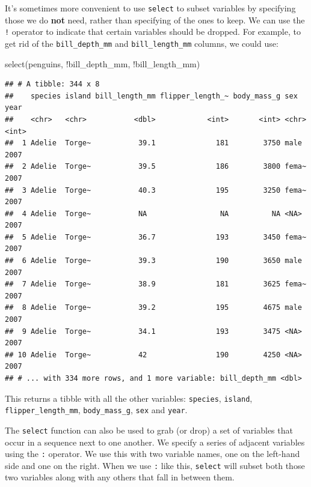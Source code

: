 \documentclass[
]{book}
\newenvironment{Shaded}{\begin{snugshade}}{\end{snugshade}}
\newcommand{\FunctionTok}[1]{\textcolor[rgb]{0.00,0.00,0.00}{#1}}
\newcommand{\NormalTok}[1]{#1}
\newcommand{\SpecialCharTok}[1]{\textcolor[rgb]{0.00,0.00,0.00}{#1}}
\begin{document}
It's sometimes more convenient to use \texttt{select} to subset variables by specifying those we do \textbf{not} need, rather than specifying of the ones to keep. We can use the \texttt{!} operator to indicate that certain variables should be dropped. For example, to get rid of the \texttt{bill\_depth\_mm} and \texttt{bill\_length\_mm} columns, we could use:

\begin{Shaded}
\begin{Highlighting}[]
\FunctionTok{select}\NormalTok{(penguins, }\SpecialCharTok{!}\NormalTok{bill\_depth\_mm, }\SpecialCharTok{!}\NormalTok{bill\_length\_mm)}
\end{Highlighting}
\end{Shaded}

\begin{verbatim}
## # A tibble: 344 x 8
##    species island bill_length_mm flipper_length_~ body_mass_g sex    year
##    <chr>   <chr>           <dbl>            <int>       <int> <chr> <int>
##  1 Adelie  Torge~           39.1              181        3750 male   2007
##  2 Adelie  Torge~           39.5              186        3800 fema~  2007
##  3 Adelie  Torge~           40.3              195        3250 fema~  2007
##  4 Adelie  Torge~           NA                 NA          NA <NA>   2007
##  5 Adelie  Torge~           36.7              193        3450 fema~  2007
##  6 Adelie  Torge~           39.3              190        3650 male   2007
##  7 Adelie  Torge~           38.9              181        3625 fema~  2007
##  8 Adelie  Torge~           39.2              195        4675 male   2007
##  9 Adelie  Torge~           34.1              193        3475 <NA>   2007
## 10 Adelie  Torge~           42                190        4250 <NA>   2007
## # ... with 334 more rows, and 1 more variable: bill_depth_mm <dbl>
\end{verbatim}

This returns a tibble with all the other variables: \texttt{species}, \texttt{island}, \texttt{flipper\_length\_mm}, \texttt{body\_mass\_g}, \texttt{sex} and \texttt{year}.

The \texttt{select} function can also be used to grab (or drop) a set of variables that occur in a sequence next to one another. We specify a series of adjacent variables using the \texttt{:} operator. We use this with two variable names, one on the left-hand side and one on the right. When we use \texttt{:} like this, \texttt{select} will subset both those two variables along with any others that fall in between them.
\end{document}
